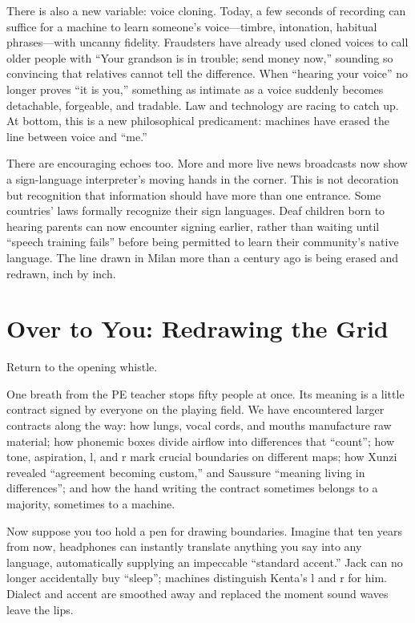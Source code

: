There is also a new variable: voice cloning. Today, a few seconds of recording can suffice for a machine to learn someone's voice---timbre, intonation, habitual phrases---with uncanny fidelity. Fraudsters have already used cloned voices to call older people with ``Your grandson is in trouble; send money now,'' sounding so convincing that relatives cannot tell the difference. When ``hearing your voice'' no longer proves ``it is you,'' something as intimate as a voice suddenly becomes detachable, forgeable, and tradable. Law and technology are racing to catch up. At bottom, this is a new philosophical predicament: machines have erased the line between voice and ``me.''

There are encouraging echoes too. More and more live news broadcasts now show a sign-language interpreter's moving hands in the corner. This is not decoration but recognition that information should have more than one entrance. Some countries' laws formally recognize their sign languages. Deaf children born to hearing parents can now encounter signing earlier, rather than waiting until ``speech training fails'' before being permitted to learn their community's native language. The line drawn in Milan more than a century ago is being erased and redrawn, inch by inch.

\section{Over to You: Redrawing the Grid}
Return to the opening whistle.

One breath from the PE teacher stops fifty people at once. Its meaning is a little contract signed by everyone on the playing field. We have encountered larger contracts along the way: how lungs, vocal cords, and mouths manufacture raw material; how phonemic boxes divide airflow into differences that ``count''; how tone, aspiration, l, and r mark crucial boundaries on different maps; how Xunzi revealed ``agreement becoming custom,'' and Saussure ``meaning living in differences''; and how the hand writing the contract sometimes belongs to a majority, sometimes to a machine.

Now suppose you too hold a pen for drawing boundaries. Imagine that ten years from now, headphones can instantly translate anything you say into any language, automatically supplying an impeccable ``standard accent.'' Jack can no longer accidentally buy ``sleep''; machines distinguish Kenta's l and r for him. Dialect and accent are smoothed away and replaced the moment sound waves leave the lips.

